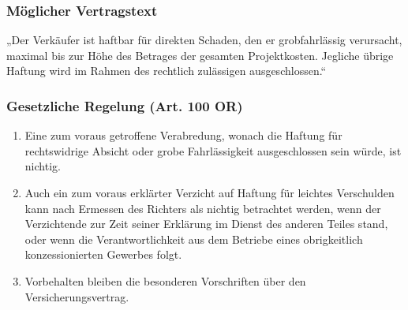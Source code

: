 \subsubsection{Möglicher Vertragstext}
„Der Verkäufer ist haftbar für direkten Schaden, den
er grobfahrlässig verursacht, maximal bis zur Höhe
des Betrages der gesamten Projektkosten. Jegliche
übrige Haftung wird im Rahmen des rechtlich
zulässigen ausgeschlossen.“

\subsubsection{Gesetzliche Regelung (Art. 100 OR)}
\begin{enumerate}
	\item Eine zum voraus getroffene Verabredung, wonach die Haftung für
	rechtswidrige Absicht oder grobe Fahrlässigkeit ausgeschlossen sein würde,
	ist nichtig.
	\item Auch ein zum voraus erklärter Verzicht auf Haftung für leichtes Verschulden
	kann nach Ermessen des Richters als nichtig betrachtet werden, wenn der
	Verzichtende zur Zeit seiner Erklärung im Dienst des anderen Teiles stand, oder
	wenn die Verantwortlichkeit aus dem Betriebe eines obrigkeitlich
	konzessionierten Gewerbes folgt.
	\item Vorbehalten bleiben die besonderen Vorschriften über den
	Versicherungsvertrag.
\end{enumerate}
